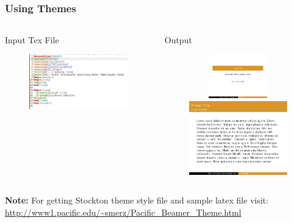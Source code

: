 \documentclass[[newPxFont]{beamer}
\begin{document}
\subsection{}
\begin{frame}
  \frametitle{Using Themes}
\begin{columns}
  \begin{column}{.45\textwidth}
\begin{block}{Input Tex File}
\begin{figure}[ht]
    \centering
    \includegraphics[width=2in,height=2.in]{figs/theme.png}
 \end{figure}
 \end{block}
  \end{column}
  \begin{column}{.55\textwidth}
\begin{block}{Output}
    \begin{figure}[ht]
    \centering
    \includegraphics[width=1.75in,height=0.75in]{figs/theme-0.png}\\\includegraphics[width=2in]{figs/theme-1.png} 
  \end{figure}
  \end{block}
  \end{column}
\end{columns}
  \begin{small}
  \textbf{\color{green} Note:} For getting Stockton theme style file and sample latex file visit:
  \url{http://www1.pacific.edu/~smerz/Pacific_Beamer_Theme.html} 
  \end{small} 
  \end{frame}
\end{document}
